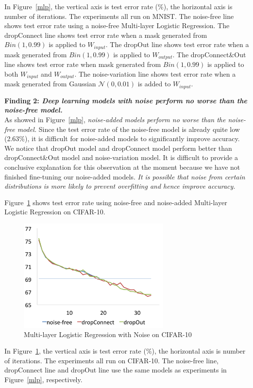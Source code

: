 In Figure~\ref{mlp}, the vertical axis is test error rate (\%), the
horizontal axis is number of iterations. The experiments all run on MNIST.
The noise-free line shows test error rate using a noise-free Multi-layer
Logistic Regression.
The dropConnect line shows test error rate when a mask generated from
$Bin(1,0.99)$ is applied to $W_{input}$.
The dropOut line shows test error rate when a mask generated from
$Bin(1,0.99)$ is applied to $W_{output}$.
The dropConnect\&Out line shows test error rate when mask generated
from $Bin(1,0.99)$ is applied to both $W_{input}$ and $W_{output}$.
The noise-variation line shows test error rate when a mask generated from
Gaussian $\mathcal{N}(0,0.01)$ is added to $W_{input}$.

{\bf Finding 2: {\em Deep learning models with noise perform no worse than
the noise-free model.}} \\
As showed in Figure~\ref{mlp}, {\em noise-added models perform no worse than the noise-free model.}
Since the test error rate of the noise-free model is already
quite low (2.63\%), it is difficult for noise-added models to significantly
improve accuracy. We notice that dropOut model and dropConnect model
perform better than dropConnect\&Out model and noise-variation model.
It is difficult to provide a conclusive explanation for this observation at
the moment because we have not finished fine-tuning our noise-added models.
{\em It is possible that noise from certain distributions is more
likely to prevent overfitting and hence improve accuracy.}

Figure~\ref{mlp10} shows test error rate using noise-free and noise-added
Multi-layer Logistic Regression on CIFAR-10.
\begin{figure}
\centering
\includegraphics[width=215pt]{f-figs/mlp10.png}
\caption{Multi-layer Logistic Regression with Noise on CIFAR-10}
\label{mlp10}
\end{figure}
In Figure~\ref{mlp10}, the vertical axis is test error rate (\%), the
horizontal axis is number of iterations. The experiments all run on
CIFAR-10. The noise-free line, dropConnect line and dropOut line use
the same models as experiments in Figure~\ref{mlp}, respectively.

